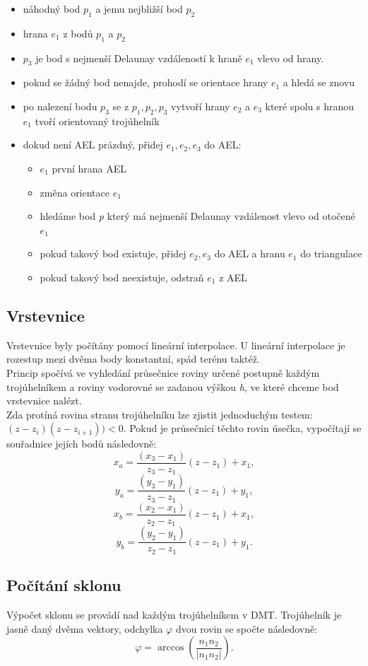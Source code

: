 \documentclass{article}
\begin{document}
\begin{itemize} 
\item náhodný bod \textit{$p_1$} a jemu nejbližší bod \textit{$p_2$}
\item hrana \textit{$e_1$} z bodů \textit{$p_1$} a \textit{$p_2$}
\item \textit{$p_3$} je bod s nejmenší Delaunay vzdáleností k hraně \textit{$e_1$} vlevo od hrany. 
\item pokud se žádný bod nenajde, prohodí se orientace hrany \textit{$e_1$} a hledá se znovu
\item po nalezení bodu \textit{$p_3$} se z \textit{$p_1, p_2, p_3$} vytvoří hrany \textit{$e_2$} a \textit{$e_3$} které spolu s hranou \textit{$e_1$} tvoří orientovaný trojúhelník
\item dokud není AEL prázdný, přidej \textit{$e_1, e_2, e_3$} do AEL: 
	\begin{itemize}
	\item \textit{$e_1$} první hrana AEL
	\item změna orientace \textit{$e_1$}
	\item hledáme bod \textit{p} který má nejmenší Delaunay vzdálenost vlevo od otočené \textit{$e_1$}
	\item pokud takový bod existuje, přidej \textit{$e_2, e_3$} do AEL a hranu  \textit{$e_1$} do triangulace
	\item pokud takový bod neexistuje, odstraň \textit{$e_1$} z AEL
	\end{itemize}
\end{itemize}
\subsection{Vrstevnice}
\indent Vrstevnice byly počítány pomocí lineární interpolace. U lineární interpolace je rozestup mezi dvěma body konstantní, spád terénu taktéž. \\
\indent Princip spočívá ve vyhledání průsečnice roviny určené postupně každým trojúhelníkem a roviny vodorovné se zadanou výškou \textit{h}, ve které chceme bod vrstevnice nalézt. \\
\indent Zda protíná rovina stranu trojúhelníku lze zjistit jednoduchým testem:
$(z-z_i)(z-z_{i+1}))<0$.
\indent Pokud je průsečnicí těchto rovin úsečka, vypočítají se souřadnice jejích bodů následovně:
$$ x_a = \frac{(x_3-x_1)}{z_3-z_1}(z-z_1)+x_1, $$
$$y_a = \frac{(y_3-y_1)}{z_3-z_1}(z-z_1)+y_1,$$
$$ x_b = \frac{(x_2-x_1)}{z_2-z_1}(z-z_1)+x_1, $$
$$y_b = \frac{(y_2-y_1)}{z_2-z_1}(z-z_1)+y_1.$$
\subsection{Počítání sklonu} 
\indent Výpočet sklonu se provádí nad každým trojúhelníkem v DMT. Trojúhelník je jasně daný dvěma vektory, odchylka $\varphi$ dvou rovin se spočte následovně: 
$$\varphi = \arccos(\frac{n_1n_2}{|n_1n_2|}).$$
\end{document}
